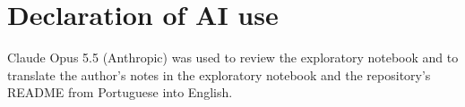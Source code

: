 \section*{Declaration of AI use}
Claude Opus 5.5 (Anthropic) was used to review the
exploratory notebook and to
translate the author's notes in the exploratory notebook and the repository's
README from Portuguese into English.
